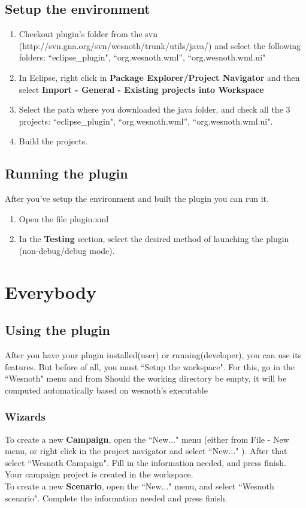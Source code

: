\documentclass[10pt]{article}
\begin{document}
\subsection{Setup the environment}
\begin{enumerate}
\item Checkout plugin's folder from the svn (http://svn.gna.org/svn/wesnoth/trunk/utils/java/) and select the following folders: ``eclipse\_plugin", ``org.wesnoth.wml'', ``org.wesnoth.wml.ui"
\item In Eclipse, right click in \textbf{Package Explorer/Project Navigator} and then select
 \textbf{Import - General - Existing projects into Workspace}
\item Select the path where you downloaded the java folder, and check all the 3 projects: ``eclipse\_plugin", ``org.wesnoth.wml'', ``org.wesnoth.wml.ui".
\item Build the projects.
\end{enumerate}

\subsection{Running the plugin}
After you've setup the environment and built the plugin you can run it.
\begin{enumerate}
\item Open the file plugin.xml
\item In the \textbf{Testing} section, select the desired method of launching the plugin
  (non-debug/debug mode).
\end{enumerate}

\section{Everybody}
\subsection{Using the plugin}
After you have your plugin installed(user) or running(developer), you can use its features.
But before of all, you must ``Setup the workspace". For this, go in the ``Wesnoth" menu and from 	
Should the working directory be empty, it will be computed automatically
based on wesnoth's executable

\subsubsection{Wizards}
To create a new \textbf{Campaign}, open the ``New..." menu (either from File - New menu, or right click in the
project navigator and select ``New..." ). After that select ``Wesnoth Campaign". Fill in the information needed,
and press finish. Your campaign project is created in the workspace. \\
To create a new \textbf{Scenario}, open the ``New..." menu, and select ``Wesnoth scenario".
Complete the information needed and press finish.
\end{document}
